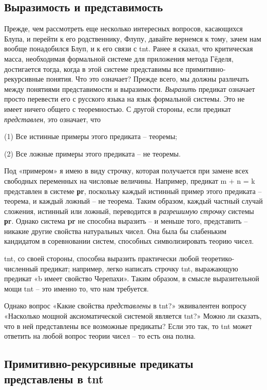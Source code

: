 \documentclass[../main.tex]{subfiles}
\begin{document}
\subsection{Выразимость и представимость}

Прежде, чем рассмотреть еще несколько интересных вопросов, касающихся Блупа, и перейти к его родственнику, Флупу, давайте вернемся к тому, зачем нам вообще понадобился Блуп, и к его связи с \acs{tnt}\@. Ранее я сказал, что критическая масса, необходимая формальной системе для приложения метода Гёделя, достигается тогда, когда в этой системе представимы все примитивно-рекурсивные понятия. Что это означает? Прежде всего, мы должны различать между понятиями представимости и выразимости. \emph{Выразить} предикат означает просто перевести его с русского языка на язык формальной системы. Это не имеет ничего общего с теоремностью. С другой стороны, если предикат \emph{представлен}, это означает, что

(1) Все истинные примеры этого предиката \--- теоремы;

(2) Все ложные примеры этого предиката \--- не теоремы.

Под «примером» я имею в виду строчку, которая получается при замене всех свободных переменных на числовые величины. Например, предикат m + n = k представлен в системе \textbf{рr}, поскольку каждый истинный пример этого предиката \--- теорема, и каждый ложный \--- не теорема. Таким образом, каждый частный случай сложения, истинный или ложный, переводится в \emph{разрешимую строчку} системы \textbf{рr}. Однако система \textbf{pr} не способна выразить \--- и меньше того, представить \--- никакие другие свойства натуральных чисел. Она была бы слабеньким кандидатом в соревновании систем, способных символизировать теорию чисел.

\acs{tnt}, со своей стороны, способна выразить практически любой теоретико-численный предикат; например, легко написать строчку \acs{tnt}, выражающую предикат «b имеет свойство Черепахи». Таким образом, в смысле выразительной мощи \acs{tnt} \--- это именно то, что нам требуется.

Однако вопрос «Какие свойства \emph{представлены} в \acs{tnt}?» эквивалентен вопросу «Насколько мощной аксиоматической системой является \acs{tnt}?» Можно ли сказать, что в ней представлены все возможные предикаты? Если это так, то \acs{tnt} может ответить на любой вопрос теории чисел \--- то есть она полна.


\subsection{Примитивно-рекурсивные предикаты представлены в \acs{tnt}}
\end{document}
